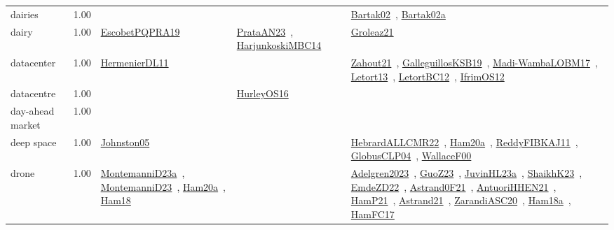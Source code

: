 {\begin{longtable}{p{3cm}r>{\raggedright\arraybackslash}p{6cm}>{\raggedright\arraybackslash}p{6cm}>{\raggedright\arraybackslash}p{8cm}}
\index{dairies}\index{ApplicationAreas!dairies}dairies &  1.00 &  &  & \href{../works/Bartak02.pdf}{Bartak02}~\cite{Bartak02}, \href{../works/Bartak02a.pdf}{Bartak02a}~\cite{Bartak02a}\\
\index{dairy}\index{ApplicationAreas!dairy}dairy &  1.00 & \href{../works/EscobetPQPRA19.pdf}{EscobetPQPRA19}~\cite{EscobetPQPRA19} & \href{../works/PrataAN23.pdf}{PrataAN23}~\cite{PrataAN23}, \href{../works/HarjunkoskiMBC14.pdf}{HarjunkoskiMBC14}~\cite{HarjunkoskiMBC14} & \href{../works/Groleaz21.pdf}{Groleaz21}~\cite{Groleaz21}\\
\index{datacenter}\index{ApplicationAreas!datacenter}datacenter &  1.00 & \href{../works/HermenierDL11.pdf}{HermenierDL11}~\cite{HermenierDL11} &  & \href{../works/Zahout21.pdf}{Zahout21}~\cite{Zahout21}, \href{../works/GalleguillosKSB19.pdf}{GalleguillosKSB19}~\cite{GalleguillosKSB19}, \href{../works/Madi-WambaLOBM17.pdf}{Madi-WambaLOBM17}~\cite{Madi-WambaLOBM17}, \href{../works/Letort13.pdf}{Letort13}~\cite{Letort13}, \href{../works/LetortBC12.pdf}{LetortBC12}~\cite{LetortBC12}, \href{../works/IfrimOS12.pdf}{IfrimOS12}~\cite{IfrimOS12}\\
\index{datacentre}\index{ApplicationAreas!datacentre}datacentre &  1.00 &  & \href{../works/HurleyOS16.pdf}{HurleyOS16}~\cite{HurleyOS16} & \\
\index{day-ahead market}\index{ApplicationAreas!day-ahead market}day-ahead market &  1.00 &  &  & \\
\index{deep space}\index{ApplicationAreas!deep space}deep space &  1.00 & \href{../works/Johnston05.pdf}{Johnston05}~\cite{Johnston05} &  & \href{../works/HebrardALLCMR22.pdf}{HebrardALLCMR22}~\cite{HebrardALLCMR22}, \href{../works/Ham20a.pdf}{Ham20a}~\cite{Ham20a}, \href{../works/ReddyFIBKAJ11.pdf}{ReddyFIBKAJ11}~\cite{ReddyFIBKAJ11}, \href{../works/GlobusCLP04.pdf}{GlobusCLP04}~\cite{GlobusCLP04}, \href{../works/WallaceF00.pdf}{WallaceF00}~\cite{WallaceF00}\\
\index{drone}\index{ApplicationAreas!drone}drone &  1.00 & \href{../works/MontemanniD23a.pdf}{MontemanniD23a}~\cite{MontemanniD23a}, \href{../works/MontemanniD23.pdf}{MontemanniD23}~\cite{MontemanniD23}, \href{../works/Ham20a.pdf}{Ham20a}~\cite{Ham20a}, \href{../works/Ham18.pdf}{Ham18}~\cite{Ham18} &  & \href{../works/Adelgren2023.pdf}{Adelgren2023}~\cite{Adelgren2023}, \href{../works/GuoZ23.pdf}{GuoZ23}~\cite{GuoZ23}, \href{../works/JuvinHL23a.pdf}{JuvinHL23a}~\cite{JuvinHL23a}, \href{../works/ShaikhK23.pdf}{ShaikhK23}~\cite{ShaikhK23}, \href{../works/EmdeZD22.pdf}{EmdeZD22}~\cite{EmdeZD22}, \href{../works/Astrand0F21.pdf}{Astrand0F21}~\cite{Astrand0F21}, \href{../works/AntuoriHHEN21.pdf}{AntuoriHHEN21}~\cite{AntuoriHHEN21}, \href{../works/HamP21.pdf}{HamP21}~\cite{HamP21}, \href{../works/Astrand21.pdf}{Astrand21}~\cite{Astrand21}, \href{../works/ZarandiASC20.pdf}{ZarandiASC20}~\cite{ZarandiASC20}, \href{../works/Ham18a.pdf}{Ham18a}~\cite{Ham18a}, \href{../works/HamFC17.pdf}{HamFC17}~\cite{HamFC17}\\

\end{longtable}}
